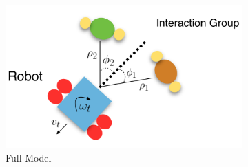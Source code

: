 \documentclass[letterpaper, 10 pt, conference]{ieeeconf}
\begin{document}
  	\begin{figure}[tbh]
      \begin{subfigure}[b]{0.45\columnwidth}

    \includegraphics[scale = 0.22]{images/data.png}
    \caption{Full Model}
    \label{fig:data}
  \end{subfigure}
    	\hspace{4mm}
  \begin{subfigure}[b]{0.45\columnwidth}


\end{subfigure}
\end{figure}
\end{document}
